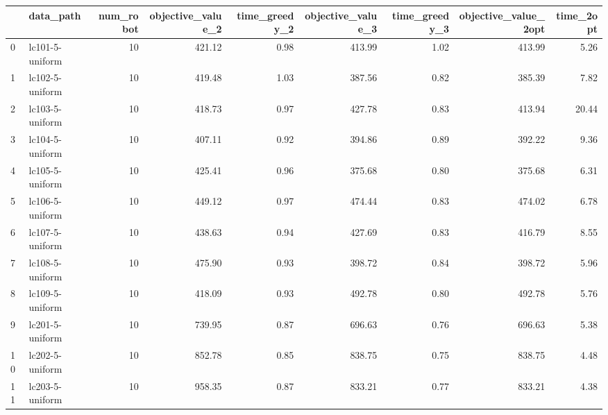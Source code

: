 \begin{tabular}{llrrrrrrr}
\toprule
{} &                 data\_path &  num\_robot &  objective\_value\_2 &  time\_greedy\_2 &  objective\_value\_3 &  time\_greedy\_3 &  objective\_value\_2opt &  time\_2opt \\
\midrule
0  &   lc101-5-uniform &         10 &             421.12 &           0.98 &             413.99 &           1.02 &                413.99 &       5.26 \\
1  &   lc102-5-uniform &         10 &             419.48 &           1.03 &             387.56 &           0.82 &                385.39 &       7.82 \\
2  &   lc103-5-uniform &         10 &             418.73 &           0.97 &             427.78 &           0.83 &                413.94 &      20.44 \\
3  &   lc104-5-uniform &         10 &             407.11 &           0.92 &             394.86 &           0.89 &                392.22 &       9.36 \\
4  &   lc105-5-uniform &         10 &             425.41 &           0.96 &             375.68 &           0.80 &                375.68 &       6.31 \\
5  &   lc106-5-uniform &         10 &             449.12 &           0.97 &             474.44 &           0.83 &                474.02 &       6.78 \\
6  &   lc107-5-uniform &         10 &             438.63 &           0.94 &             427.69 &           0.83 &                416.79 &       8.55 \\
7  &   lc108-5-uniform &         10 &             475.90 &           0.93 &             398.72 &           0.84 &                398.72 &       5.96 \\
8  &   lc109-5-uniform &         10 &             418.09 &           0.93 &             492.78 &           0.80 &                492.78 &       5.76 \\
9  &   lc201-5-uniform &         10 &             739.95 &           0.87 &             696.63 &           0.76 &                696.63 &       5.38 \\
10 &   lc202-5-uniform &         10 &             852.78 &           0.85 &             838.75 &           0.75 &                838.75 &       4.48 \\
11 &   lc203-5-uniform &         10 &             958.35 &           0.87 &             833.21 &           0.77 &                833.21 &       4.38 \\

\end{tabular}
